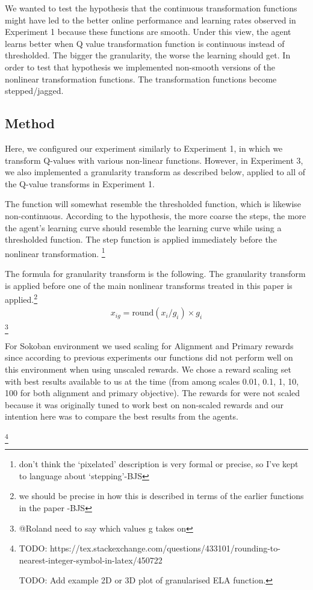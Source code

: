 

We wanted to test the hypothesis that the continuous transformation functions might have led to the better online performance and learning rates observed in Experiment 1 because these functions are smooth. Under this view, the agent learns better when Q value transformation function is continuous instead of thresholded. The bigger the granularity, the worse the learning should get. In order to test that hypothesis we implemented non-smooth versions of the nonlinear transformation functions. The transformation functions become stepped/jagged.

\subsection{Method}

Here, we configured our experiment similarly to Experiment 1, in which we transform Q-values with various non-linear functions. However, in Experiment 3, we also implemented a granularity transform as described below, applied to all of the Q-value transforms in Experiment 1.

The function will somewhat resemble the thresholded function, which is likewise non-continuous. According to the hypothesis, the more coarse the steps, the more the agent's learning curve should resemble the learning curve while using a thresholded function. The step function is applied immediately before the nonlinear transformation. \footnote{don't think the `pixelated' description is very formal or precise, so I've kept to language about `stepping'-BJS}

The formula for granularity transform is the following. The granularity transform is applied before one of the main nonlinear transforms treated in this paper is applied.\footnote{we should be precise in how this is described in terms of the earlier functions in the paper -BJS}
\begin{align}
x_{ig} = \text{round}(x_i / g_i) \times g_i
\end{align} \footnote{@Roland need to say which values g takes on}

For Sokoban environment we used scaling for Alignment and Primary rewards since according to previous experiments our functions did not perform well on this environment when using unscaled rewards. We chose a reward scaling set with best results available to us at the time (from among scales 0.01, 0.1, 1, 10, 100 for both alignment and primary objective). The rewards for \tloA{} were not scaled because it was originally tuned to work best on non-scaled rewards and our intention here was to compare the best results from the agents.


\footnote{TODO: https://tex.stackexchange.com/questions/433101/rounding-to-nearest-integer-symbol-in-latex/450722

TODO: Add example 2D or 3D plot of granularised ELA function.}



